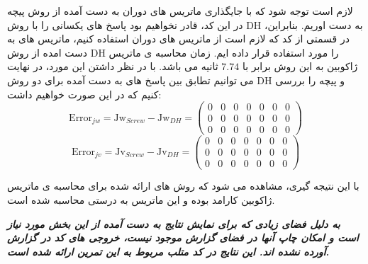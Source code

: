 لازم است توجه شود که با جایگذاری ماتریس های دوران به دست آمده از روش پیچه در این کد، قادر نخواهیم بود پاسخ های یکسانی را با روش DH به دست اوریم. بنابراین، در قسمتی از کد که لازم است از ماتریس های دوران استفاده کنیم، ماتریس های به دست امده از روش DH را مورد استفاده قرار داده ایم. زمان محاسبه ی ماتریس ژاکوبین به این روش برابر با $7.74$ ثانیه می باشد.
با در نظر داشتن این مورد، در نهایت می توانیم تطابق بین پاسخ های به دست آمده برای دو روش DH و پیچه را بررسی کنیم که در این صورت خواهیم داشت:
\[
\text{Error}_{jw} = \text{Jw}_{Screw} - \text{Jw}_{DH} = 
\begin{pmatrix}
	0 & 0 & 0 & 0 & 0 & 0 & 0 \\
	0 & 0 & 0 & 0 & 0 & 0 & 0 \\
	0 & 0 & 0 & 0 & 0 & 0 & 0
\end{pmatrix}
\]
\[
\text{Error}_{jv} = \text{Jv}_{Screw} - \text{Jv}_{DH} = 
\begin{pmatrix}
	0 & 0 & 0 & 0 & 0 & 0 & 0 \\
	0 & 0 & 0 & 0 & 0 & 0 & 0 \\
	0 & 0 & 0 & 0 & 0 & 0 & 0
\end{pmatrix}
\]

با این نتیجه گیری، مشاهده می شود که روش های ارائه شده برای محاسبه ی ماتریس ژاکوبین کارامد بوده و این ماتریس به درستی محاسبه شده است.

\textbf{\textit{به دلیل فضای زیادی که برای نمایش نتایج به دست آمده از این بخش مورد نیاز است و امکان چاپ آنها در فضای گزارش موجود نیست، خروجی های کد در گزارش آورده نشده اند. این نتایج در کد متلب مربوط به این تمرین ارائه شده است.}}












